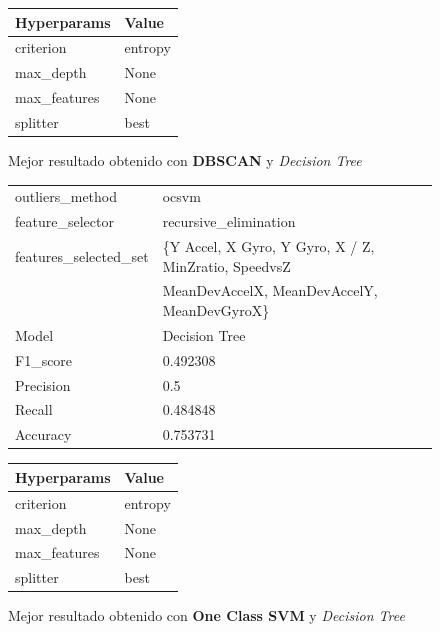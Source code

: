 \begin{appendices}
\begin{figure}[htb]
			\begin{tabular}{ll}
				\toprule
				 Hyperparams &   Value \\
				\midrule
				   criterion & entropy \\
				   max\_depth &    None \\
				max\_features &    None \\
					splitter &    best \\
				\bottomrule
			\end{tabular}
			\caption{Mejor resultado obtenido con \textbf{DBSCAN} y \emph{Decision Tree}}
			\label{table:23}
		\end{figure}

		\begin{figure}[htb]
			\centering
			\begin{tabular}{ll}
				\toprule
					  outliers\_method &                                              ocsvm \\
					 feature\_selector &                              recursive\_elimination \\
				features\_selected\_set & \{Y Accel, X Gyro, Y Gyro, X / Z, MinZratio, SpeedvsZ \\
									{} & MeanDevAccelX, MeanDevAccelY, MeanDevGyroX\} \\
								Model &                                      Decision Tree \\
						F1\_score &                                           0.492308 \\
					   Precision &                                                0.5 \\
						  Recall &                                           0.484848 \\
						Accuracy &                                           0.753731 \\
				\bottomrule
			\end{tabular}
			\newline
			\newline

			\begin{tabular}{ll}
				\toprule
				 Hyperparams &   Value \\
				\midrule
				   criterion & entropy \\
				   max\_depth &    None \\
				max\_features &    None \\
					splitter &    best \\
				\bottomrule
			\end{tabular}
			\caption{Mejor resultado obtenido con \textbf{One Class SVM} y \emph{Decision Tree}}
			\label{table:24}
		\end{figure}


\end{appendices}

